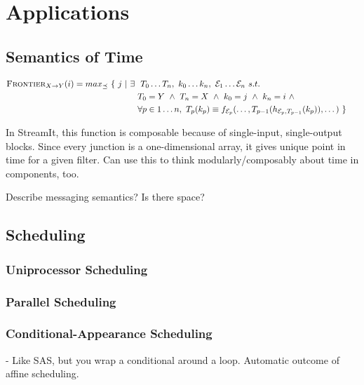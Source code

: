 \section{Applications}

\subsection{Semantics of Time}

\noindent {\bf \dep}

\begin{align*}
\textsc{Frontier}_{X \small{\rightarrow} Y}(i) = max_{\preceq}~\{~ j ~|~ \exists ~&~ T_0 \dots T_n, ~ k_0 \dots k_n, ~ {\cal E}_1 \dots {\cal E}_n ~ s.t. ~ & ~ \\ 
~ & T_0 = Y ~\wedge~ T_n = X ~\wedge~ k_0 = j ~\wedge~ k_n = i ~\wedge~ & ~ \\
~ & \forall p \in 1 \dots n, ~ T_p(k_p) \equiv f_{{\cal E}_p}(\dots, T_{p-1}(h_{{{\cal E}_p}, T_{p-1}}(k_p)), \dots) ~ \} & ~ \\
\end{align*}

In StreamIt, this function is composable because of single-input,
single-output blocks.  Since every junction is a one-dimensional
array, it gives unique point in time for a given filter.  Can use this
to think modularly/composably about time in components, too.

Describe messaging semantics?  Is there space?

\subsection{Scheduling}

\subsubsection{Uniprocessor Scheduling}

\subsubsection{Parallel Scheduling}

\subsubsection{Conditional-Appearance Scheduling}

- Like SAS, but you wrap a conditional around a loop.  Automatic
  outcome of affine scheduling.

